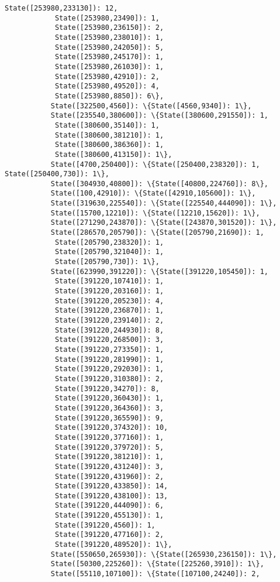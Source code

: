 \documentclass[11pt]{article}
\begin{document}
\begin{Verbatim}[commandchars=\\\{\}]
            State([253980,233130]): 12,
            State([253980,23490]): 1,
            State([253980,236150]): 2,
            State([253980,238010]): 1,
            State([253980,242050]): 5,
            State([253980,245170]): 1,
            State([253980,261030]): 1,
            State([253980,42910]): 2,
            State([253980,49520]): 4,
            State([253980,8850]): 6\},
           State([322500,4560]): \{State([4560,9340]): 1\},
           State([235540,380600]): \{State([380600,291550]): 1,
            State([380600,35140]): 1,
            State([380600,381210]): 1,
            State([380600,386360]): 1,
            State([380600,413150]): 1\},
           State([4700,250400]): \{State([250400,238320]): 1, State([250400,730]): 1\},
           State([304930,40800]): \{State([40800,224760]): 8\},
           State([100,42910]): \{State([42910,105600]): 1\},
           State([319630,225540]): \{State([225540,444090]): 1\},
           State([15700,12210]): \{State([12210,15620]): 1\},
           State([271290,243870]): \{State([243870,301520]): 1\},
           State([286570,205790]): \{State([205790,21690]): 1,
            State([205790,238320]): 1,
            State([205790,321040]): 1,
            State([205790,730]): 1\},
           State([623990,391220]): \{State([391220,105450]): 1,
            State([391220,107410]): 1,
            State([391220,203160]): 1,
            State([391220,205230]): 4,
            State([391220,236870]): 1,
            State([391220,239140]): 2,
            State([391220,244930]): 8,
            State([391220,268500]): 3,
            State([391220,273350]): 1,
            State([391220,281990]): 1,
            State([391220,292030]): 1,
            State([391220,310380]): 2,
            State([391220,34270]): 8,
            State([391220,360430]): 1,
            State([391220,364360]): 3,
            State([391220,365590]): 9,
            State([391220,374320]): 10,
            State([391220,377160]): 1,
            State([391220,379720]): 5,
            State([391220,381210]): 1,
            State([391220,431240]): 3,
            State([391220,431960]): 2,
            State([391220,433850]): 14,
            State([391220,438100]): 13,
            State([391220,444090]): 6,
            State([391220,455130]): 1,
            State([391220,4560]): 1,
            State([391220,477160]): 2,
            State([391220,489520]): 1\},
           State([550650,265930]): \{State([265930,236150]): 1\},
           State([50300,225260]): \{State([225260,3910]): 1\},
           State([55110,107100]): \{State([107100,24240]): 2,

\end{Verbatim}
\end{document}

